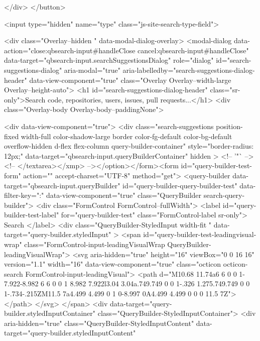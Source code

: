           </div>
      </button>

    <input type="hidden" name="type" class="js-site-search-type-field">

    
<div class="Overlay--hidden " data-modal-dialog-overlay>
  <modal-dialog data-action="close:qbsearch-input#handleClose cancel:qbsearch-input#handleClose" data-target="qbsearch-input.searchSuggestionsDialog" role="dialog" id="search-suggestions-dialog" aria-modal="true" aria-labelledby="search-suggestions-dialog-header" data-view-component="true" class="Overlay Overlay--width-large Overlay--height-auto">
      <h1 id="search-suggestions-dialog-header" class="sr-only">Search code, repositories, users, issues, pull requests...</h1>
    <div class="Overlay-body Overlay-body--paddingNone">
      
          <div data-view-component="true">        <div class="search-suggestions position-fixed width-full color-shadow-large border color-fg-default color-bg-default overflow-hidden d-flex flex-column query-builder-container"
          style="border-radius: 12px;"
          data-target="qbsearch-input.queryBuilderContainer"
          hidden
        >
          <!-- '"` --><!-- </textarea></xmp> --></option></form><form id="query-builder-test-form" action="" accept-charset="UTF-8" method="get">
  <query-builder data-target="qbsearch-input.queryBuilder" id="query-builder-query-builder-test" data-filter-key=":" data-view-component="true" class="QueryBuilder search-query-builder">
    <div class="FormControl FormControl--fullWidth">
      <label id="query-builder-test-label" for="query-builder-test" class="FormControl-label sr-only">
        Search
      </label>
      <div
        class="QueryBuilder-StyledInput width-fit "
        data-target="query-builder.styledInput"
      >
          <span id="query-builder-test-leadingvisual-wrap" class="FormControl-input-leadingVisualWrap QueryBuilder-leadingVisualWrap">
            <svg aria-hidden="true" height="16" viewBox="0 0 16 16" version="1.1" width="16" data-view-component="true" class="octicon octicon-search FormControl-input-leadingVisual">
    <path d="M10.68 11.74a6 6 0 0 1-7.922-8.982 6 6 0 0 1 8.982 7.922l3.04 3.04a.749.749 0 0 1-.326 1.275.749.749 0 0 1-.734-.215ZM11.5 7a4.499 4.499 0 1 0-8.997 0A4.499 4.499 0 0 0 11.5 7Z"></path>
</svg>
          </span>
        <div data-target="query-builder.styledInputContainer" class="QueryBuilder-StyledInputContainer">
          <div
            aria-hidden="true"
            class="QueryBuilder-StyledInputContent"
            data-target="query-builder.styledInputContent"
